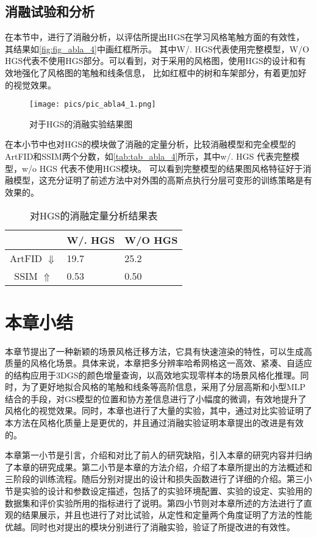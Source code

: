 \subsection{消融试验和分析}
在本节中，进行了消融分析，以评估所提出HGS在学习风格笔触方面的有效性，其结果如\autoref{fig:fig_abla_4}中画红框所示。
其中W/. HGS代表使用完整模型，W/O HGS代表不使用HGS部分。可以看到，对于采用的风格图，使用HGS的设计和有效地强化了风格图的笔触和线条信息，
比如红框中的树和车架部分，有着更加好的视觉效果。

\begin{figure}[htb]
    \centering
    \texttt{[image: pics/pic\_abla4\_1.png]}
    \caption{\label{fig:fig_abla_4}对于HGS的消融实验结果图}
\end{figure}

\par 在本小节中也对HGS的模块做了消融的定量分析，比较消融模型和完全模型的ArtFID和SSIM两个分数，如\autoref{tab:tab_abla_4}所示，其中w/. HGS 代表完整模型，w/o HGS 代表不使用HGS模块。
可以看到完整模型的结果图风格特征好于消融模型，这充分证明了前述方法中对外围的高斯点执行分层可变形的训练策略是有效果的。
\begin{table}[htb]
    \caption{\label{tab:tab_abla_4}对HGS的消融定量分析结果表}
    \begin{tabularx}{\linewidth}{c  X<{\centering} X<{\centering}}
        \hline
          & W/. HGS & W/O HGS \\ \hline
        ArtFID $\Downarrow$  & 19.7 & 25.2 \\ 
        SSIM $\Uparrow$  & 0.53 &  0.50 \\ \hline
    \end{tabularx}
\end{table}
\section{本章小结}
本章节提出了一种新颖的场景风格迁移方法，它具有快速渲染的特性，可以生成高质量的风格化场景。具体来说，本章把多分辨率哈希网格这一高效、紧凑、自适应的结构应用于3DGS的颜色增量查询，以高效地实现零样本的场景风格化推理。同时，为了更好地拟合风格的笔触和线条等高阶信息，采用了分层高斯和小型MLP结合的手段，对GS模型的位置和协方差信息进行了小幅度的微调，有效地提升了风格化的视觉效果。同时，本章也进行了大量的实验，其中，通过对比实验证明了本方法在风格化质量上是更优的，并且通过消融实验证明本章提出的改进是有效的。
\par 本章第一小节是引言，介绍和对比了前人的研究缺陷，引入本章的研究内容并归纳了本章的研究成果。第二小节是本章的方法介绍，介绍了本章所提出的方法概述和三阶段的训练流程。随后分别对提出的设计和损失函数进行了详细的介绍。第三小节是实验的设计和参数设定描述，包括了的实验环境配置、实验的设定、实验用的数据集和评价实验所用的指标进行了说明。第四小节则对本章所述的方法进行了直观的结果展示，并且也进行了对比试验，从定性和定量两个角度证明了方法的性能优越。同时也对提出的模块分别进行了消融实验，验证了所提改进的有效性。
